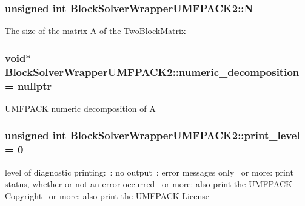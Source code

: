 \subsubsection[{\texorpdfstring{N}{N}}]{\setlength{\rightskip}{0pt plus 5cm}unsigned int Block\+Solver\+Wrapper\+U\+M\+F\+P\+A\+C\+K2\+::N\hspace{0.3cm}{\ttfamily [private]}}\hypertarget{class_block_solver_wrapper_u_m_f_p_a_c_k2_a85d397826a36330bf3602d510acdd8d4}{}\label{class_block_solver_wrapper_u_m_f_p_a_c_k2_a85d397826a36330bf3602d510acdd8d4}
The size of the matrix A of the \hyperlink{class_two_block_matrix}{Two\+Block\+Matrix} 
\subsubsection[{\texorpdfstring{numeric\+\_\+decomposition}{numeric_decomposition}}]{\setlength{\rightskip}{0pt plus 5cm}void$\ast$ Block\+Solver\+Wrapper\+U\+M\+F\+P\+A\+C\+K2\+::numeric\+\_\+decomposition = nullptr\hspace{0.3cm}{\ttfamily [private]}}\hypertarget{class_block_solver_wrapper_u_m_f_p_a_c_k2_ac3a439162324f36f5162439c075d02eb}{}\label{class_block_solver_wrapper_u_m_f_p_a_c_k2_ac3a439162324f36f5162439c075d02eb}
U\+M\+F\+P\+A\+CK numeric decomposition of A 
\subsubsection[{\texorpdfstring{print\+\_\+level}{print_level}}]{\setlength{\rightskip}{0pt plus 5cm}unsigned int Block\+Solver\+Wrapper\+U\+M\+F\+P\+A\+C\+K2\+::print\+\_\+level = 0}\hypertarget{class_block_solver_wrapper_u_m_f_p_a_c_k2_af78261735f66012f531c3a71c9640d2c}{}\label{class_block_solver_wrapper_u_m_f_p_a_c_k2_af78261735f66012f531c3a71c9640d2c}
level of diagnostic printing\+:~\+: no output~\+: error messages only~ or more\+: print status, whether or not an error occurred~ or more\+: also print the U\+M\+F\+P\+A\+CK Copyright~ or more\+: also print the U\+M\+F\+P\+A\+CK License 
